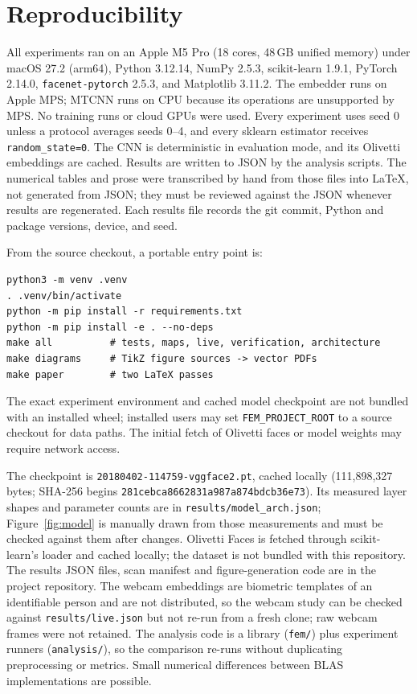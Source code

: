 \section{Reproducibility}\label{sec:repro}

All experiments ran on an Apple M5 Pro (18 cores, 48\,GB unified memory) under macOS 27.2 (arm64), Python 3.12.14, NumPy 2.5.3, scikit-learn 1.9.1, PyTorch 2.14.0, \texttt{facenet-pytorch} 2.5.3, and Matplotlib 3.11.2. The embedder runs on Apple MPS; MTCNN runs on CPU because its operations are unsupported by MPS. No training runs or cloud GPUs were used. Every experiment uses seed 0 unless a protocol averages seeds 0--4, and every sklearn estimator receives \texttt{random\_state=0}. The CNN is deterministic in evaluation mode, and its Olivetti embeddings are cached. Results are written to JSON by the analysis scripts. The numerical tables and prose were transcribed by hand from those files into LaTeX, not generated from JSON; they must be reviewed against the JSON whenever results are regenerated. Each results file records the git commit, Python and package versions, device, and seed.

From the source checkout, a portable entry point is:
\begin{verbatim}
python3 -m venv .venv
. .venv/bin/activate
python -m pip install -r requirements.txt
python -m pip install -e . --no-deps
make all          # tests, maps, live, verification, architecture
make diagrams     # TikZ figure sources -> vector PDFs
make paper        # two LaTeX passes
\end{verbatim}
The exact experiment environment and cached model checkpoint are not bundled with an installed
wheel; installed users may set \texttt{FEM\_PROJECT\_ROOT} to a source checkout for data paths.
The initial fetch of Olivetti faces or model weights may require network access.

The checkpoint is \texttt{20180402-114759-\allowbreak vggface2.pt}, cached locally (111,898,327 bytes; SHA-256 begins \texttt{281cebca\allowbreak 8662831a\allowbreak 987a874b\allowbreak dcb36e73}). Its measured layer shapes and parameter counts are in \texttt{results/model\_arch.json}; Figure~\ref{fig:model} is manually drawn from those measurements and must be checked against them after changes. Olivetti Faces is fetched through scikit-learn's loader and cached locally; the dataset is not bundled with this repository. The results JSON files, scan manifest and figure-generation code are in the project repository. The webcam embeddings are biometric templates of an identifiable person and are not distributed, so the webcam study can be checked against \texttt{results/live.json} but not re-run from a fresh clone; raw webcam frames were not retained. The analysis code is a library (\texttt{fem/}) plus experiment runners (\texttt{analysis/}), so the comparison re-runs without duplicating preprocessing or metrics. Small numerical differences between BLAS implementations are possible.
